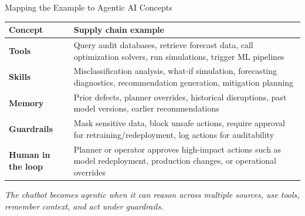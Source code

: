 \begin{frame}{Mapping the Example to Agentic AI Concepts}

\small
\renewcommand{\arraystretch}{1.3}
\begin{tabular}{p{2.0cm} p{8.5cm}}
\toprule
\textbf{Concept} & \textbf{Supply chain example} \\
\midrule
\textbf{Tools} & Query audit databases, retrieve forecast data, call optimization solvers, run simulations, trigger ML pipelines \\
\textbf{Skills} & Misclassification analysis, what-if simulation, forecasting diagnostics, recommendation generation, mitigation planning \\
\textbf{Memory} & Prior defects, planner overrides, historical disruptions, past model versions, earlier recommendations \\
\textbf{Guardrails} & Mask sensitive data, block unsafe actions, require approval for retraining/redeployment, log actions for auditability \\
\textbf{Human in the loop} & Planner or operator approves high-impact actions such as model redeployment, production changes, or operational overrides \\
\bottomrule
\end{tabular}

\vspace{0.5em}
\small\textit{The chatbot becomes agentic when it can reason across multiple sources, use tools, remember context, and act under guardrails.}

\end{frame}


